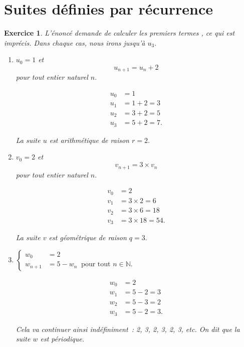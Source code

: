 \documentclass[10pt]{article}
\newtheorem{exo}{Exercice}
\begin{document}
\section{Suites définies par récurrence}







\begin{exo}

L'énoncé demande de \og calculer les premiers termes \fg, ce qui est imprécis. Dans chaque cas, nous irons jusqu'à $u_3.$

\begin{enumerate}
\item $u_0=1$ et \[u_{n+1}=u_n+2\] pour tout entier naturel $n.$

\begin{align*}
u_0&=1\\
u_1&=1+2=3\\
u_2&=3+2=5\\
u_3&=5+2=7.\end{align*}

\medskip

La suite $u$ est arithmétique de raison $r=2.$

\item $v_0=2$ et \[v_{n+1}=3\times v_n\] pour tout entier naturel $n.$

\begin{align*}
v_0&=2\\
v_1&=3\times 2=6\\
v_2&=3\times 6=18\\
v_3&=3\times 18=54.\end{align*}

\medskip

La suite $v$ est géométrique de raison $q=3.$

\item $\begin{cases} w_0&=2\\
w_{n+1}&=5-w_n~\text{ pour tout } n\in\mathbb{N}. \end{cases}$

\begin{align*}
w_0&=2\\
w_1&=5-2=3\\
w_2&=5-3=2\\
w_3&=5-2=3.\end{align*}

\medskip

Cela va continuer ainsi indéfiniment~: 2, 3, 2, 3, 2, 3, etc. On dit que la suite $w$ est périodique.



\end{enumerate}
\end{exo}
\end{document}

